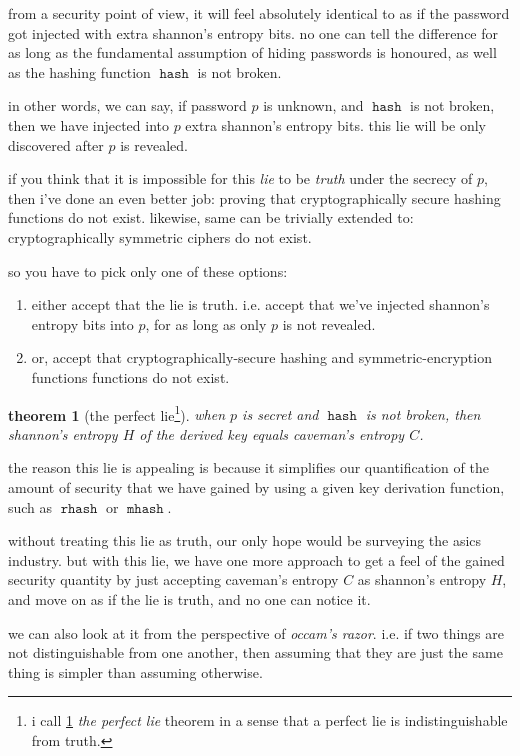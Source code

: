 \documentclass[twocolumn]{article}
\newtheorem{theorem}{theorem}
\DeclareMathOperator{\hash}{\mathtt{hash}}
\DeclareMathOperator{\rhash}{\mathtt{rhash}}
\DeclareMathOperator{\mhash}{\mathtt{mhash}}
\begin{document}
from a security point of view, it will feel absolutely identical to as if
the password got injected with extra shannon's entropy bits.  no one can
tell the difference for as long as the fundamental assumption of hiding
passwords is honoured, as well as the hashing function $\hash$ is not
broken.

in other words, we can say, if password $p$ is unknown, and $\hash$ is not
broken, then we have injected into $p$ extra shannon's entropy bits.  this
lie will be only discovered after $p$ is revealed.

if you think that it is impossible for this \emph{lie} to be \emph{truth}
under the secrecy of $p$, then i've done an even better job: proving that
cryptographically secure hashing functions do not exist.  likewise, same
can be trivially extended to: cryptographically symmetric ciphers do not
exist.

so you have to pick only one of these options:
\begin{enumerate}
    \item either accept that the lie is truth.  i.e. accept that we've
    injected shannon's entropy bits into $p$, for as long as only $p$ is
    not revealed.
    \item or, accept that cryptographically-secure hashing and
    symmetric-encryption functions functions do not exist.
\end{enumerate}

\begin{theorem}
    [the perfect lie\footnote{i call \cref{theorem_perfect_lie} \emph{the
    perfect lie} theorem in a sense that a perfect lie is indistinguishable
    from truth.}]
    \label{theorem_perfect_lie}
when $p$ is secret and $\hash$ is not broken, then shannon's entropy $H$ of
the derived key equals caveman's entropy $C$.
\end{theorem}

the reason this lie is appealing is because it simplifies our
quantification of the amount of security that we have gained by using a
given key derivation function, such as $\rhash$ or $\mhash$.

without treating this lie as truth, our only hope would be surveying the
asics industry.  but with this lie, we have one more approach to get a feel
of the gained security quantity by just accepting caveman's entropy $C$ as
shannon's entropy $H$, and move on as if the lie is truth, and no one can
notice it.

we can also look at it from the perspective of \emph{occam's razor}.  i.e.
if two things are not distinguishable from one another, then assuming that
they are just the same thing is simpler than assuming otherwise.  
\end{document}
